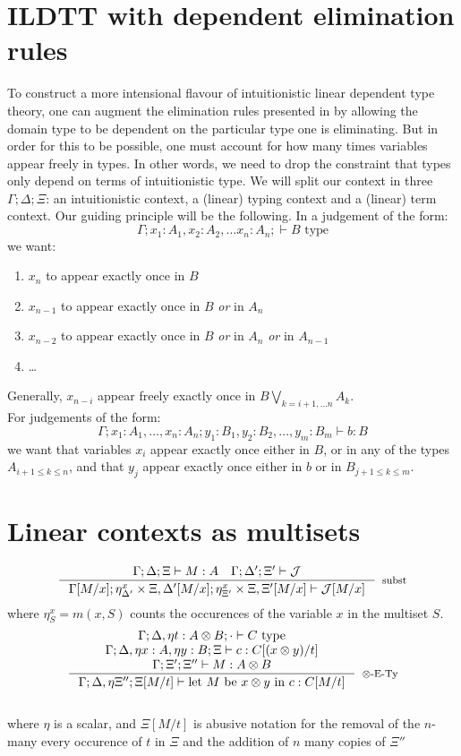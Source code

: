 \section{ILDTT with dependent elimination rules}
To construct a more intensional flavour of intuitionistic linear dependent type theory, one can augment the elimination rules presented in \cite{vakar14} by allowing the domain type to be dependent on the particular type one is eliminating.
But in order for this to be possible, one must account for how many times variables appear freely in types. In other words, we need to drop the constraint that types only depend on terms of intuitionistic type. We will split our context in three $\Gamma; \Delta; \Xi$: an intuitionistic context, a (linear) typing context and a (linear) term context.
Our guiding principle will be the following. In a judgement of the form:
\[
\Gamma; x_1 : A_1, x_2 : A_2, \dots x_n : A_n; \vdash B \text{ type}
\]
we want:
\begin{enumerate}
\item $x_n$ to appear exactly once in $B$
\item $x_{n-1}$ to appear exactly once in $B$ \textit{or } in $A_n$
\item $x_{n-2}$ to appear exactly once in $B$ \textit{or} in $A_n$ \textit{or} in $A_{n-1}$
\item \dots
\end{enumerate}
Generally, $x_{n-i}$ appear freely exactly once in $B \bigvee_{k = i + 1, \dots n} A_k$.\\
For judgements of the form:
\[
\Gamma; x_1 : A_1, \dots, x_n : A_n; y_1 : B_1, y_2 : B_2, \dots, y_m : B_m \vdash b : B
\]
we want that variables $x_i$ appear exactly once either in $B$, or in any of the types $A_{i+1 \leq k \leq n}$, and that $y_j$ appear exactly once either in $b$ or in $B_{j+1 \leq k \leq m}$.
\section{Linear contexts as multisets}
\[
\inference{\Gamma; \Delta; \Xi \vdash M: A \quad \Gamma; \Delta';\Xi' \vdash \mathcal{J}}
          {\Gamma[M/x]; \eta_{\Delta'}^x \times \Xi, \Delta'[M/x]; \eta_{\Xi'}^x \times \Xi, \Xi'[M/x] \vdash \mathcal{J}[M/x] }[subst]
\]
where $\eta_{S}^x = m(x, S)$ counts the occurences of the variable $x$ in the multiset $S$.
\[
\begin{split}
\inference {\Gamma; \Delta, \eta t: A \otimes B; \cdot \vdash C \text{ type}\\
\Gamma; \Delta, \eta x: A, \eta y: B; \Xi \vdash c : C[(x \otimes y)/t]\\
\Gamma; \Xi'; \Xi'' \vdash M: A \otimes B\\
}
           {\Gamma; \Delta, \eta \Xi''; \Xi[M/t] \vdash \text{let $M$ be $x \otimes y$ in $c$} : C[M/t]
           }[$\otimes$-E-Ty]
\end{split}
\]\\
where $\eta$ is a scalar, and $\Xi[M/t]$ is abusive notation for the removal of the $n$-many every occurence of $t$ in $\Xi$ and the addition of $n$ many copies of $\Xi''$
